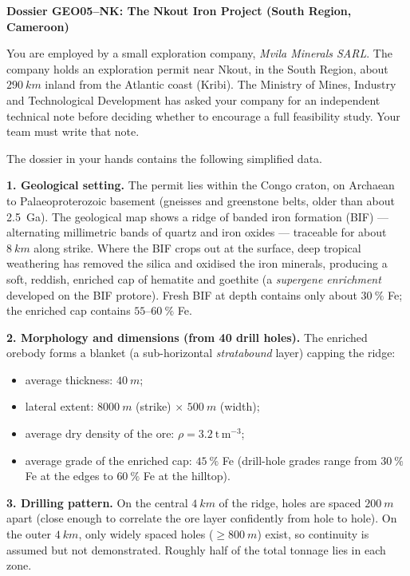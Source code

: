 \documentclass[11pt]{article}
\newcommand{\cle}[1]{{\popxbold\color{popdark}#1}}
\newcounter{popsec}
\newcounter{popsub}
\newcommand{\courssub}[1]{%
  \stepcounter{popsub}%
  \par\vspace{9pt}\noindent{\popxbold\fontsize{11.5}{13}\selectfont\color{popink}{\color{poporange}\thepopsec.\thepopsub}\hspace{6pt}#1}\par\nopagebreak\vspace{4pt}
}
\begin{document}
\courssub{Situation}

\textbf{Dossier GEO05--NK: The Nkout Iron Project (South Region, Cameroon)}\par

You are employed by a small exploration company, \emph{Mvila Minerals SARL}. The company holds an exploration permit near Nkout, in the South Region, about $\SI{290}{km}$ inland from the Atlantic coast (Kribi). The Ministry of Mines, Industry and Technological Development has asked your company for an independent technical note before deciding whether to encourage a full feasibility study. Your team must write that note.

The dossier in your hands contains the following simplified data.

\textbf{1. Geological setting.} The permit lies within the \cle{Congo craton}, on Archaean to Palaeoproterozoic basement (gneisses and greenstone belts, older than about 2.5~Ga). The geological map shows a ridge of \cle{banded iron formation} (BIF) --- alternating millimetric bands of quartz and iron oxides --- traceable for about $\SI{8}{km}$ along strike. Where the BIF crops out at the surface, deep tropical weathering has removed the silica and oxidised the iron minerals, producing a soft, reddish, enriched cap of \cle{hematite} and \cle{goethite} (a \emph{supergene enrichment} developed on the BIF protore). Fresh BIF at depth contains only about $30\ \%$ Fe; the enriched cap contains $55$--$60\ \%$ Fe.

\textbf{2. Morphology and dimensions (from 40 drill holes).} The enriched orebody forms a \cle{blanket} (a sub-horizontal \emph{stratabound} layer) capping the ridge:
\begin{itemize}
\item average thickness: $\SI{40}{m}$;
\item lateral extent: $\SI{8000}{m}$ (strike) $\times$ $\SI{500}{m}$ (width);
\item average dry density of the ore: $\rho = 3.2\ \mathrm{t\,m^{-3}}$;
\item average grade of the enriched cap: $45\ \%$ Fe (drill-hole grades range from $30\ \%$ Fe at the edges to $60\ \%$ Fe at the hilltop).
\end{itemize}

\textbf{3. Drilling pattern.} On the central $\SI{4}{km}$ of the ridge, holes are spaced $\SI{200}{m}$ apart (close enough to correlate the ore layer confidently from hole to hole). On the outer $\SI{4}{km}$, only widely spaced holes ($\geq \SI{800}{m}$) exist, so continuity is assumed but not demonstrated. Roughly half of the total tonnage lies in each zone.
\end{document}

